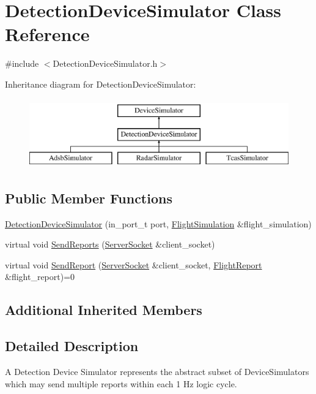\hypertarget{class_detection_device_simulator}{}\section{Detection\+Device\+Simulator Class Reference}
\label{class_detection_device_simulator}


{\ttfamily \#include $<$Detection\+Device\+Simulator.\+h$>$}

Inheritance diagram for Detection\+Device\+Simulator\+:\begin{figure}[H]
\begin{center}
\leavevmode
\includegraphics[height=3.000000cm]{class_detection_device_simulator}
\end{center}
\end{figure}
\subsection*{Public Member Functions}
\begin{DoxyCompactItemize}
\item 
\hyperlink{class_detection_device_simulator_af0a303fa4f52fbfef8c96221e36df4a7}{Detection\+Device\+Simulator} (in\+\_\+port\+\_\+t port, \hyperlink{class_flight_simulation}{Flight\+Simulation} \&flight\+\_\+simulation)
\item 
virtual void \hyperlink{class_detection_device_simulator_a2113f1c6b67158c24c311b9f80685004}{Send\+Reports} (\hyperlink{class_server_socket}{Server\+Socket} \&client\+\_\+socket)
\item 
virtual void \hyperlink{class_detection_device_simulator_ae9e5d29238a9bcc104b4004b52ddffd9}{Send\+Report} (\hyperlink{class_server_socket}{Server\+Socket} \&client\+\_\+socket, \hyperlink{class_flight_report}{Flight\+Report} \&flight\+\_\+report)=0
\end{DoxyCompactItemize}
\subsection*{Additional Inherited Members}


\subsection{Detailed Description}
A Detection Device Simulator represents the abstract subset of Device\+Simulators which may send multiple reports within each 1 Hz logic cycle. 

